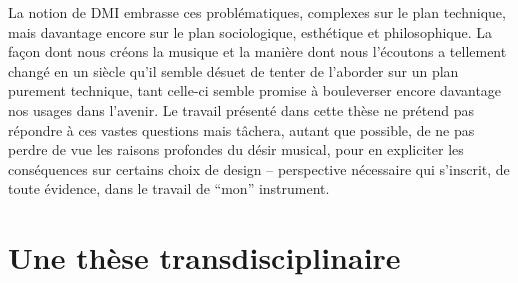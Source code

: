 \indent La notion de \gls{DMI} embrasse ces problématiques, complexes sur le plan technique, mais davantage encore sur le plan sociologique, esthétique et philosophique. La façon dont nous créons la musique et la manière dont nous l’écoutons a tellement changé en un siècle qu’il semble désuet de tenter de l’aborder sur un plan purement technique, tant celle-ci semble promise à bouleverser encore davantage nos usages dans l’avenir. Le travail présenté dans cette thèse ne prétend pas répondre à ces vastes questions mais tâchera, autant que possible, de ne pas perdre de vue les raisons profondes du désir musical, pour en expliciter les conséquences sur certains choix de design -- perspective nécessaire qui s'inscrit, de toute évidence, dans le travail de ``mon'' instrument.

\section{Une thèse transdisciplinaire}

